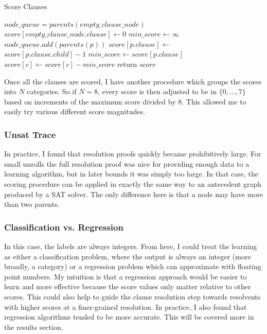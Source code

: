 \documentclass[letterpaper]{article} %
\begin{document}
\begin{algorithm}
\caption{Score Clauses}\label{scoring}
\begin{algorithmic}[1]
\State $node\_queue = parents(empty\_clause\_node)$
\State $score[empty\_clause\_node.clause] \gets 0$
\State $min\_score \gets \infty$
\State $node\_queue.add(parents(p))$
\State $score[p.clause] \gets $
\State \ \ \ \ \ \ \ \ \ $score[p.clause.child] - 1$
\State $min\_score \gets score[p.clause]$
\EndIf
\EndFor
{}
\State $score[c] \gets score[c] - min\_score$
\EndFor
\State return $score$
\EndProcedure
\end{algorithmic}
\end{algorithm} 

Once all the clauses are scored, I have another procedure which groups the scores into $N$ categories. So if $N=8$,  every score is then adjusted to be in $\{0, \dots, 7\}$ based on increments of the maximum score divided by $8$. This allowed me to easily try various different score magnitudes.

\subsubsection{Unsat Trace}
In practice, I found that resolution proofs quickly became prohibitively large. For small unrolls the full resolution proof was nice for providing enough data to a learning algorithm, but in later bounds it was simply too large. In that case, the scoring procedure can be applied in exactly the same way to an antecedent graph produced by a SAT solver. The only difference here is that a node may have more than two parents.
\subsubsection{Classification vs. Regression}
In this case, the labels are always integers. From here, I could treat the learning as either a classification problem, where the output is always an integer (more broadly, a category) or a regression problem which can approximate with floating point numbers. My intuition is that a regression approach would be easier to learn and more effective because the score values only matter relative to other scores. This could also help to guide the clause resolution step towards resolvents with higher scores at a finer-grained resolution. In practice, I also found that regression algorithms tended to be more accurate. This will be covered more in the results section.
\end{document}
